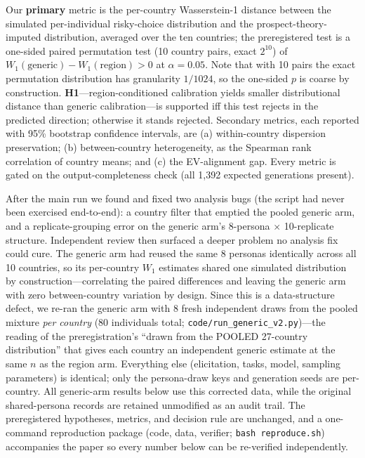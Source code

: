 \documentclass[10pt,letterpaper]{article}
\begin{document}
Our \textbf{primary} metric is the per-country Wasserstein-1 distance
between the simulated per-individual risky-choice distribution and the
prospect-theory-imputed distribution, averaged over the ten countries; the
preregistered test is a one-sided paired permutation test (10 country
pairs, exact $2^{10}$) of $W_1(\mathrm{generic}) - W_1(\mathrm{region}) > 0$
at $\alpha=0.05$. Note that with 10 pairs the exact permutation
distribution has granularity $1/1024$, so the one-sided $p$ is coarse by
construction. \textbf{H1}---region-conditioned calibration yields smaller
distributional distance than generic calibration---is supported iff this
test rejects in the predicted direction; otherwise it stands rejected.
Secondary metrics, each reported with 95\% bootstrap confidence intervals,
are (a) within-country dispersion preservation; (b) between-country
heterogeneity, as the Spearman rank correlation of country means; and (c)
the EV-alignment gap. Every metric is gated on the output-completeness
check (all 1,392 expected generations present).

After the main run we found and fixed two analysis bugs (the script had
never been exercised end-to-end): a country filter that emptied the pooled
generic arm, and a replicate-grouping error on the generic arm's 8-persona
$\times$ 10-replicate structure. Independent review then surfaced a deeper
problem no analysis fix could cure. The generic arm had reused the same 8
personas identically across all 10 countries, so its per-country $W_1$
estimates shared one simulated distribution by construction---correlating
the paired differences and leaving the generic arm with zero
between-country variation by design. Since this is a data-structure defect,
we re-ran the generic arm with 8 fresh independent draws from the pooled
mixture \textit{per country} (80 individuals total;
\texttt{code/run\_generic\_v2.py})---the reading of the preregistration's
``drawn from the POOLED 27-country distribution'' that gives each country
an independent generic estimate at the same $n$ as the region arm.
Everything else (elicitation, tasks, model, sampling parameters) is
identical; only the persona-draw keys and generation seeds are per-country.
All generic-arm results below use this corrected data, while the original
shared-persona records are retained unmodified as an audit trail. The
preregistered hypotheses, metrics, and decision rule are unchanged, and a
one-command reproduction package (code, data, verifier;
\texttt{bash reproduce.sh}) accompanies the paper so every number below
can be re-verified independently.
\end{document}
